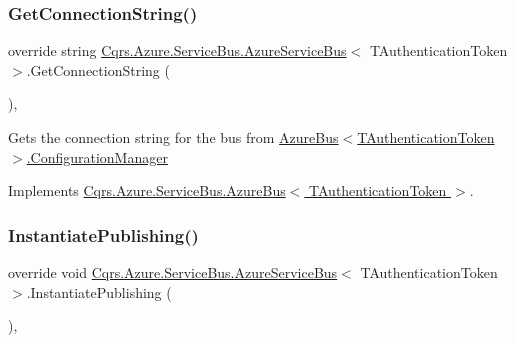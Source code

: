 \mbox{\label{classCqrs_1_1Azure_1_1ServiceBus_1_1AzureServiceBus_a5a3b3610dc5dfebe586262c0bc787748_a5a3b3610dc5dfebe586262c0bc787748}} 
\subsubsection{\texorpdfstring{Get\+Connection\+String()}{GetConnectionString()}}
{\footnotesize\ttfamily override string \hyperlink{classCqrs_1_1Azure_1_1ServiceBus_1_1AzureServiceBus}{Cqrs.\+Azure.\+Service\+Bus.\+Azure\+Service\+Bus}$<$ T\+Authentication\+Token $>$.Get\+Connection\+String (\begin{DoxyParamCaption}{ }\end{DoxyParamCaption})\hspace{0.3cm}{\ttfamily [protected]}, {\ttfamily [virtual]}}



Gets the connection string for the bus from \hyperlink{classCqrs_1_1Azure_1_1ServiceBus_1_1AzureBus_aaf9469d220fb23cb0521fa76b25ab228_aaf9469d220fb23cb0521fa76b25ab228}{Azure\+Bus$<$\+T\+Authentication\+Token$>$.\+Configuration\+Manager} 



Implements \hyperlink{classCqrs_1_1Azure_1_1ServiceBus_1_1AzureBus_a514e371d5ce093678365af31e6c274e3_a514e371d5ce093678365af31e6c274e3}{Cqrs.\+Azure.\+Service\+Bus.\+Azure\+Bus$<$ T\+Authentication\+Token $>$}.

\mbox{\label{classCqrs_1_1Azure_1_1ServiceBus_1_1AzureServiceBus_a5c286d29b0bbfe3770f3407efda57036_a5c286d29b0bbfe3770f3407efda57036}} 
\subsubsection{\texorpdfstring{Instantiate\+Publishing()}{InstantiatePublishing()}}
{\footnotesize\ttfamily override void \hyperlink{classCqrs_1_1Azure_1_1ServiceBus_1_1AzureServiceBus}{Cqrs.\+Azure.\+Service\+Bus.\+Azure\+Service\+Bus}$<$ T\+Authentication\+Token $>$.Instantiate\+Publishing (\begin{DoxyParamCaption}{ }\end{DoxyParamCaption})\hspace{0.3cm}{\ttfamily [protected]}, {\ttfamily [virtual]}}



